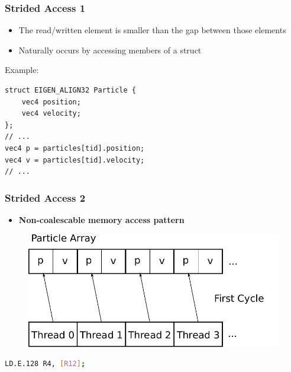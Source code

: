 \documentclass[aspectratio=169,handout]{beamer}
\begin{document}
\begin{frame}[fragile]
	\frametitle{Strided Access 1}
	\begin{itemize}
	\item The read/written element is smaller than the gap between those elements
	\item Naturally occurs by accessing members of a struct
\end{itemize}
Example:
\begin{lstlisting}       
struct EIGEN_ALIGN32 Particle {
	vec4 position;
	vec4 velocity;
};  
// ...
vec4 p = particles[tid].position;
vec4 v = particles[tid].velocity;
// ...
\end{lstlisting} 
\end{frame}


\begin{frame}[fragile]
	\frametitle{Strided Access 2}
	\begin{itemize}
	\item 	\textbf{Non-coalescable memory access pattern}
\end{itemize}
	\begin{figure}
		\centering
		\includegraphics[height=0.5\textheight]{accessParticle1}
	\end{figure}
\begin{lstlisting}[language=bash]               
LD.E.128 R4, [R12];   
\end{lstlisting} 
\end{frame}
\end{document}
